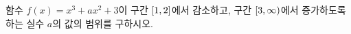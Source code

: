 함수 $f(x)=x^3+ax^2+3$이 구간 $[1{,}\mkern3mu\mathopen{}2]$에서 감소하고, 구간 $[3{,}\mkern3mu\mathopen{}\infty)$에서 증가하도록 하는 실수 $a$의 값의 범위를 구하시오.
